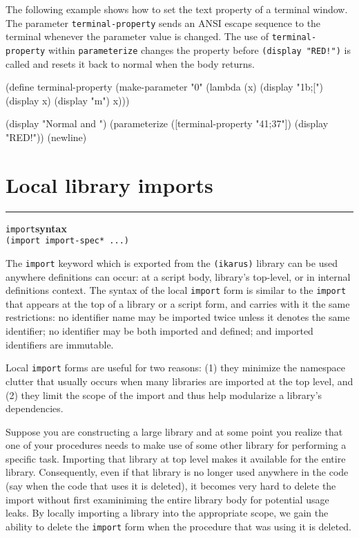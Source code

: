 \documentclass[onecolumn, 12pt, twoside, openright, dvipdfm]{book}
\makeatletter
\newcommand{\idxlabeldefun}[5]{
\vspace{1ex}
\rule{\textwidth}{2pt}
{\phantomsection\index{#1@\texttt{#2}}\label{#3}{\Large\texttt{#4}}\hfill\textbf{#5}}\\}
\newcommand{\idxdefun}[3]{\idxlabeldefun{#1}{#2}{#1}{#2}{#3}}
\newcommand{\defun}[2]{\idxdefun{#1}{#1}{#2}}
\makeatother
\begin{document}
The following example shows how to set the text property of a
terminal window.  The parameter \texttt{terminal-property} sends an
ANSI escape sequence to the terminal whenever the parameter value is
changed.  The use of \texttt{terminal-property} within
\texttt{parameterize} changes the property before
\texttt{(display~"RED!")} is called and resets it back to normal
when the body returns.

\begin{CodeInline}
(define terminal-property
  (make-parameter "0"
    (lambda (x)
      (display "\x1b;[")
      (display x)
      (display "m")
      x)))

(display "Normal and ")
(parameterize ([terminal-property "41;37"])
  (display "RED!"))
(newline)
\end{CodeInline}

\newpage
\section{Local library imports}
\defun{import}{syntax}
\texttt{(import import-spec* ...)}

The \texttt{import} keyword which is exported from the
\texttt{(ikarus)} library can be used anywhere definitions can
occur: at a script body, library's top-level, or in internal
definitions context.  The syntax of the local \texttt{import} form
is similar to the \texttt{import} that appears at the top of a
library or a script form, and carries with it the same restrictions:
no identifier name may be imported twice unless it denotes the same
identifier; no identifier may be both imported and defined; and
imported identifiers are immutable.

Local \texttt{import} forms are useful for two reasons: (1) they
minimize the namespace clutter that usually occurs when many
libraries are imported at the top level, and (2) they limit the
scope of the import and thus help modularize a library's
dependencies.

Suppose you are constructing a large library and at some point you
realize that one of your procedures needs to make use of some other
library for performing a specific task.  Importing that library at
top level makes it available for the entire library.  Consequently,
even if that library is no longer used anywhere in the code (say
when the code that uses it is deleted), it becomes very hard to
delete the import without first examiniming the entire library body
for potential usage leaks.  By locally importing a library into the
appropriate scope, we gain the ability to delete the \texttt{import}
form when the procedure that was using it is deleted.
\end{document}
